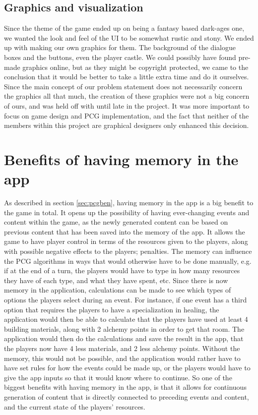 \subsection{Graphics and visualization}
Since the theme of the game ended up on being a fantasy based dark-ages one, we wanted the look and feel of the UI to be somewhat rustic and stony. We ended up with making our own graphics for them. The background of the dialogue boxes and the buttons, even the player castle. We could possibly have found pre-made graphics online, but as they might be copyright protected, we came to the conclusion that it would be better to take a little extra time and do it ourselves. Since the main concept of our problem statement does not necessarily concern the graphics all that much, the creation of these graphics were not a big concern of ours, and was held off with until late in the project. It was more important to focus on game design and PCG implementation, and the fact that neither of the members within this project are graphical designers only enhanced this decision.


\section{Benefits of having memory in the app}
As described in section \ref{sec:pcgben}, having memory in the app is a big benefit to the game in total.
It opens up the possibility of having ever-changing events and content within the game, as the newly generated content can be based on previous content that has been saved into the memory of the app.
It allows the game to have player control in terms of the resources given to the players, along with possible negative effects to the players; penalties. The memory can influence the PCG algorithms in ways that would otherwise have to be done manually, e.g. if at the end of a turn, the players would have to type in how many resources they have of each type, and what they have spent, etc.
Since there is now memory in the application, calculations can be made to see which types of options the players select during an event. For instance, if one event has a third option that requires the players to have a specialization in healing, the application would then be able to calculate that the players have used at least 4 building materials, along with 2 alchemy points in order to get that room. The application would then do the calculations and save the result in the app, that the players now have 4 less materials, and 2 less alchemy points. Without the memory, this would not be possible, and the application would rather have to have set rules for how the events could be made up, or the players would have to give the app inputs so that it would know where to continue.
So one of the biggest benefits with having memory in the app, is that it allows for continuous generation of content that is directly connected to preceding events and content, and the current state of the players' resources.

